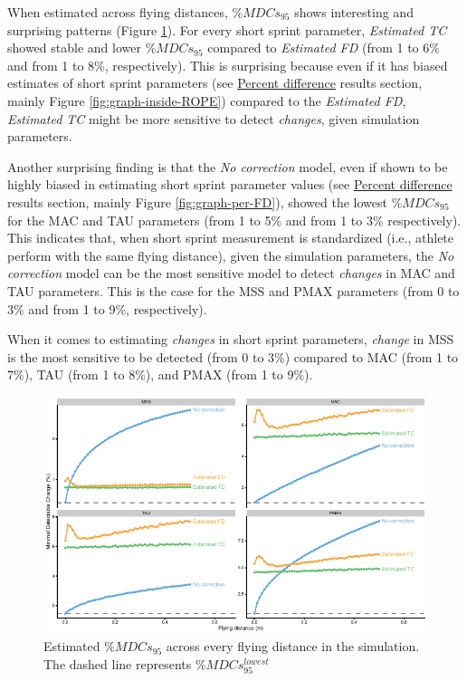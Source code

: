 \documentclass[fleqn,10pt,lineno]{wlpeerj} %
\begin{document}
When estimated across flying distances, \(\%MDCs_{95}\) shows interesting and surprising patterns (Figure \ref{fig:graph-MDC}). For every short sprint parameter, \emph{Estimated TC} showed stable and lower \(\%MDCs_{95}\) compared to \emph{Estimated FD} (from 1 to 6\% and from 1 to 8\%, respectively). This is surprising because even if it has biased estimates of short sprint parameters (see \protect\hyperlink{percent-difference}{Percent difference} results section, mainly Figure \ref{fig:graph-inside-ROPE}) compared to the \emph{Estimated FD}, \emph{Estimated TC} might be more sensitive to detect \emph{changes}, given simulation parameters.

Another surprising finding is that the \emph{No correction} model, even if shown to be highly biased in estimating short sprint parameter values (see \protect\hyperlink{percent-difference}{Percent difference} results section, mainly Figure \ref{fig:graph-per-FD}), showed the lowest \(\%MDCs_{95}\) for the MAC and TAU parameters (from 1 to 5\% and from 1 to 3\% respectively). This indicates that, when short sprint measurement is standardized (i.e., athlete perform with the same flying distance), given the simulation parameters, the \emph{No correction} model can be the most sensitive model to detect \emph{changes} in MAC and TAU parameters. This is the case for the MSS and PMAX parameters (from 0 to 3\% and from 1 to 9\%, respectively).

When it comes to estimating \emph{changes} in short sprint parameters, \emph{change} in MSS is the most sensitive to be detected (from 0 to 3\%) compared to MAC (from 1 to 7\%), TAU (from 1 to 8\%), and PMAX (from 1 to 9\%).



\begin{figure}

{\centering \includegraphics[width=0.9\linewidth]{shorts-simulation-paper_files/figure-latex/graph-MDC-1} 

}

\caption{Estimated \(\%MDCs_{95}\) across every flying distance in the simulation. The dashed line represents \(\%MDCs_{95}^{lowest}\)}\label{fig:graph-MDC}
\end{figure}
\end{document}
